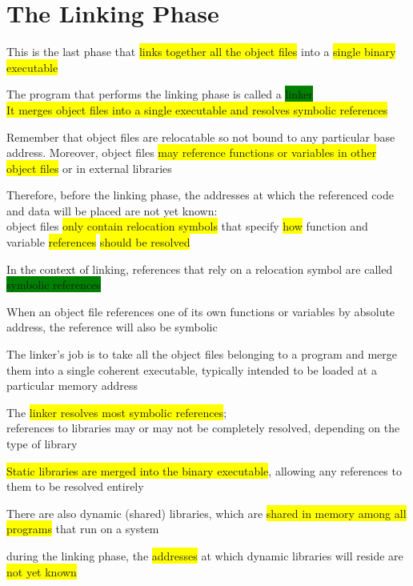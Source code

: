 \documentclass[]{project_plan}
\begin{document}
\section{The Linking Phase}

This is the last phase that \colorbox{yellow}{links together all the object files} into a
\colorbox{yellow}{single binary executable}

The program that performs the linking phase is called a \colorbox{green}{linker}\\
\colorbox{yellow}{It merges object files into a single executable and resolves symbolic references}

Remember that object files are relocatable so not bound to any particular
base address. Moreover, object files \colorbox{yellow}{may reference functions or variables
  in other object files} or in external libraries

Therefore, before the linking phase, the addresses at which the referenced
code and data will be placed are not yet known:\\
object files \colorbox{yellow}{only contain relocation symbols} that specify \colorbox{yellow}{how} function
and variable \colorbox{yellow}{references} \colorbox{yellow}{should be resolved}

In the context of linking, references that rely on a relocation symbol
are called \colorbox{green}{symbolic references}

When an object file references one of its own functions or variables
by absolute address, the reference will also be symbolic

The linker’s job is to take all the object files belonging to a program
and merge them into a single coherent executable,
typically intended to be loaded at a particular memory address

The \colorbox{yellow}{linker resolves most symbolic references};\\
references to libraries may or may not be completely resolved, depending on
the type of library

\colorbox{yellow}{Static libraries are merged into the binary executable}, allowing any
references to them to be resolved entirely

There are also dynamic (shared) libraries, which are \colorbox{yellow}{shared in memory among
  all programs} that run on a system

during the linking phase, the \colorbox{yellow}{addresses} at which dynamic libraries will
reside are \colorbox{yellow}{not yet known}
\end{document}
